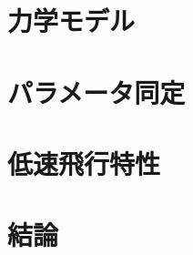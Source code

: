 \documentclass[12pt,epsf,here,fleqn]{jreport}
\begin{document}
\chapter{力学モデル}
  \label{model}
  
\chapter{パラメータ同定}
  \label{sys_id}
  
\chapter{低速飛行特性}
  \label{flight_char}
  
\chapter{結論}
  

\newpage
{}
\appendix
\end{document}
